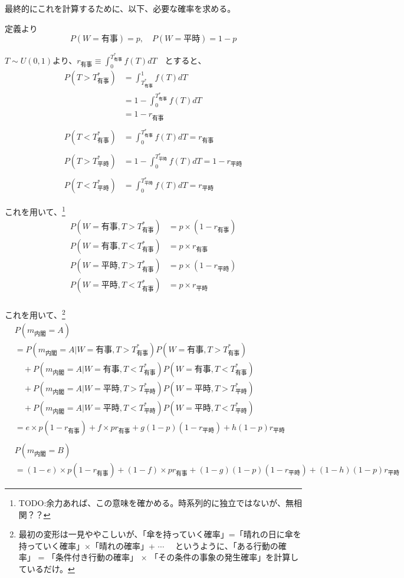 \documentclass[main.tex]{subfiles}
\begin{document}
最終的にこれを計算するために、以下、必要な確率を求める。

定義より
$$P(W={有事}) = p, \quad P(W={平時}) = 1-p$$


$T \sim U(0,1)$より、$r_{有事} \equiv \int_0^{T^*_{有事}} f(T)dT \quad {とすると、}$
\begin{align*}
    P(T>T^*_{有事}) &= \int_{T^*_{有事}}^1 f(T)dT\\
    &= 1- \int_0^{T^*_{有事}} f(T)dT\\
    &= 1-r_{有事}\\
    \\
    P(T<T^*_{有事}) &= \int_0^{T^*_{有事}} f(T)dT = r_{有事}\\
    \\
    P(T>T^*_{平時}) &= 1- \int_0^{T^*_{平時}} f(T)dT =  1-r_{平時}\\
    \\
    P(T<T^*_{平時}) &= \int_0^{T^*_{平時}} f(T)dT = r_{平時}
\end{align*}

これを用いて、\footnote{TODO:余力あれば、この意味を確かめる。時系列的に独立ではないが、無相関？？}
\begin{align*}
    P(W=有事, T>T^*_{有事}) &= p × (1-r_{有事})\\
    P(W=有事, T<T^*_{有事}) &= p × r_{有事}\\
    P(W=平時, T>T^*_{有事}) &= p × (1-r_{平時})\\
    P(W=平時, T<T^*_{有事}) &= p × r_{平時}\\
\end{align*}

これを用いて、\footnote{最初の変形は一見ややこしいが、「傘を持っていく確率」=「晴れの日に傘を持っていく確率」×「晴れの確率」+ $\cdots \quad$ 
というように、「ある行動の確率」 = 「条件付き行動の確率」 × 「その条件の事象の発生確率」を計算しているだけ。}
\begin{align*}
    & P(m_{内閣} = A) \\
    &=  P(m_{内閣} = A | W=有事, T>T^*_{有事})P(W=有事, T>T^*_{有事}) \\
    &\quad + P(m_{内閣} = A | W=有事, T<T^*_{有事})P(W=有事, T<T^*_{有事})\\
    &\quad + P(m_{内閣} = A | W=平時, T>T^*_{平時})P(W=平時, T>T^*_{平時})\\
    &\quad + P(m_{内閣} = A | W=平時, T<T^*_{平時})P(W=平時, T<T^*_{平時})\\
    &= e × p(1-r_{有事}) + f× pr_{有事} + g(1-p)(1-r_{平時}) + h(1-p)r_{平時}\\
    \\
    & P(m_{内閣} = B) \\
    &= (1-e) × p(1-r_{有事}) + (1-f)× pr_{有事} + (1-g)(1-p)(1-r_{平時}) + (1-h)(1-p)r_{平時}
\end{align*}
\end{document}

